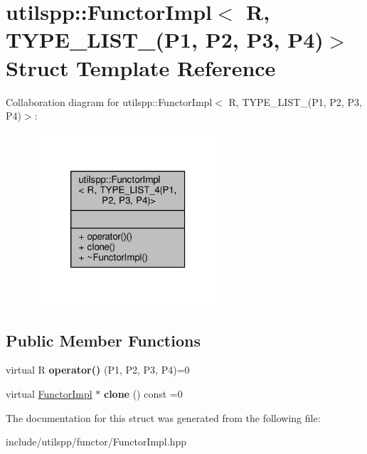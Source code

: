 \hypertarget{structutilspp_1_1FunctorImpl_3_01R_00_01TYPE__LIST__4_07P1_00_01P2_00_01P3_00_01P4_08_4}{\section{utilspp\-:\-:Functor\-Impl$<$ R, T\-Y\-P\-E\-\_\-\-L\-I\-S\-T\-\_(P1, P2, P3, P4)$>$ Struct Template Reference}
\label{structutilspp_1_1FunctorImpl_3_01R_00_01TYPE__LIST__4_07P1_00_01P2_00_01P3_00_01P4_08_4}
}


Collaboration diagram for utilspp\-:\-:Functor\-Impl$<$ R, T\-Y\-P\-E\-\_\-\-L\-I\-S\-T\-\_(P1, P2, P3, P4)$>$\-:\nopagebreak
\begin{figure}[H]
\begin{center}
\leavevmode
\includegraphics[width=198pt]{structutilspp_1_1FunctorImpl_3_01R_00_01TYPE__LIST__4_07P1_00_01P2_00_01P3_00_01P4_08_4__coll__graph}
\end{center}
\end{figure}
\subsection*{Public Member Functions}
\begin{DoxyCompactItemize}
\item 
\hypertarget{structutilspp_1_1FunctorImpl_3_01R_00_01TYPE__LIST__4_07P1_00_01P2_00_01P3_00_01P4_08_4_a2aa75b8c5b722440cd04dd3b304431ea}{virtual R {\bfseries operator()} (P1, P2, P3, P4)=0}\label{structutilspp_1_1FunctorImpl_3_01R_00_01TYPE__LIST__4_07P1_00_01P2_00_01P3_00_01P4_08_4_a2aa75b8c5b722440cd04dd3b304431ea}

\item 
\hypertarget{structutilspp_1_1FunctorImpl_3_01R_00_01TYPE__LIST__4_07P1_00_01P2_00_01P3_00_01P4_08_4_a4b4de4a3f73bbfd9037ddf380347182a}{virtual \hyperlink{structutilspp_1_1FunctorImpl}{Functor\-Impl} $\ast$ {\bfseries clone} () const =0}\label{structutilspp_1_1FunctorImpl_3_01R_00_01TYPE__LIST__4_07P1_00_01P2_00_01P3_00_01P4_08_4_a4b4de4a3f73bbfd9037ddf380347182a}

\end{DoxyCompactItemize}


The documentation for this struct was generated from the following file\-:\begin{DoxyCompactItemize}
\item 
include/utilspp/functor/Functor\-Impl.\-hpp\end{DoxyCompactItemize}
